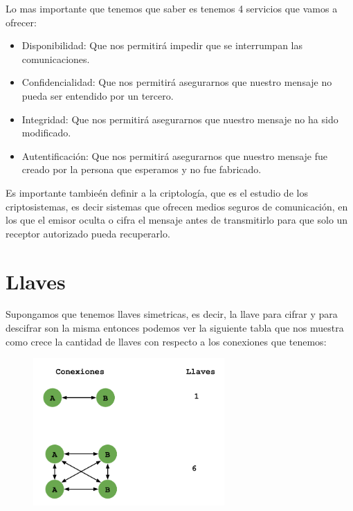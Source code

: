 \documentclass[12pt, fleqn]{report}                             %
\theoremstyle{break}                                            %
\begin{document}
        Lo mas importante que tenemos que saber es tenemos 4 servicios que vamos a ofrecer:
        \begin{itemize}
            \item Disponibilidad: Que nos permitirá impedir que se interrumpan las comunicaciones.
            \item Confidencialidad: Que nos permitirá asegurarnos que nuestro mensaje no pueda
                ser entendido por un tercero.
            \item Integridad: Que nos permitirá asegurarnos que nuestro mensaje no ha sido modificado.
            \item Autentificación: Que nos permitirá asegurarnos que nuestro mensaje fue creado por la 
                persona que esperamos y no fue fabricado.
        \end{itemize}
    

        Es importante tambieén definir a la criptología, que es el estudio de los criptosistemas, es decir
        sistemas que ofrecen medios seguros de comunicación, en los que el emisor oculta o cifra el mensaje
        antes de transmitirlo para que solo un receptor autorizado pueda recuperarlo.

        \clearpage
        \section{Llaves}
        

            Supongamos que tenemos llaves simetricas, es decir, la llave para cifrar y para descifrar
            son la misma entonces podemos ver la siguiente tabla que nos muestra como crece la cantidad de
            llaves con respecto a los conexiones que tenemos:

            \begin{figure}[h]
                \includegraphics[width=0.65\textwidth]{Llaves}
            \end{figure}
\end{document}
